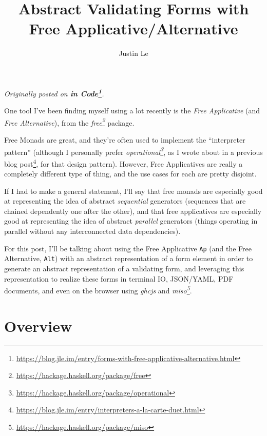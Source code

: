 \documentclass[]{article}
\title{Abstract Validating Forms with Free Applicative/Alternative}
\author{Justin Le}
\renewcommand{\href}[2]{#2\footnote{\url{#1}}}
\begin{document}
\maketitle

\emph{Originally posted on
\textbf{\href{https://blog.jle.im/entry/forms-with-free-applicative-alternative.html}{in
Code}}.}

One tool I've been finding myself using a lot recently is the \emph{Free
Applicative} (and \emph{Free Alternative}), from the
\emph{\href{https://hackage.haskell.org/package/free}{free}} package.

Free Monads are great, and they're often used to implement the ``interpreter
pattern'' (although I personally prefer
\emph{\href{https://hackage.haskell.org/package/operational}{operational}}, as I
wrote about in a
\href{https://blog.jle.im/entry/interpreters-a-la-carte-duet.html}{previous blog
post}, for that design pattern). However, Free Applicatives are really a
completely different type of thing, and the use cases for each are pretty
disjoint.

If I had to make a general statement, I'll say that free monads are especially
good at representing the idea of abstract \emph{sequential} generators
(sequences that are chained dependently one after the other), and that free
applicatives are especially good at representing the idea of abstract
\emph{parallel} generators (things operating in parallel without any
interconnected data dependencies).

For this post, I'll be talking about using the Free Applicative \texttt{Ap} (and
the Free Alternative, \texttt{Alt}) with an abstract representation of a form
element in order to generate an abstract representation of a validating form,
and leveraging this representation to realize these forms in terminal IO,
JSON/YAML, PDF documents, and even on the browser using \emph{ghcjs} and
\emph{\href{https://hackage.haskell.org/package/miso}{miso}}.

\hypertarget{overview}{%
\section{Overview}\label{overview}}
\end{document}

